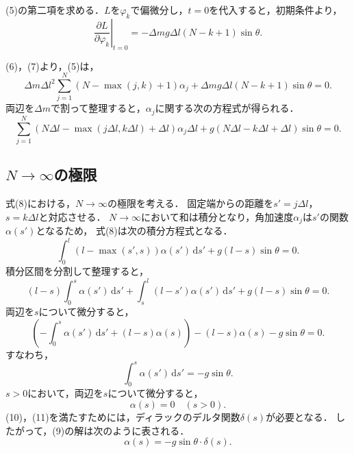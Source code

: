 \documentclass[]{jlreq}
\begin{document}
(5)の第二項を求める．$L$を$\varphi_k$で偏微分し，$t = 0$を代入すると，初期条件より，
\begin{equation}
  \left.\frac{\partial L}{\partial \varphi_k}\right|_{t = 0}
  = - \varDelta m g \varDelta l \left(N - k + 1\right) \sin \theta.
\end{equation}

(6)，(7)より，(5)は，
\begin{equation*}
  \varDelta m {\varDelta l}^2 \sum_{j = 1}^{N}
  \left(N - \max \left(j, k\right) + 1\right) \alpha_j
  + \varDelta m g \varDelta l \left(N - k + 1\right) \sin \theta = 0.
\end{equation*}
両辺を$\varDelta m$で割って整理すると，$\alpha_j$に関する次の方程式が得られる．
\begin{equation}
  \sum_{j = 1}^{N} \left(N \varDelta l
  - \max \left(j \varDelta l, k \varDelta l\right) + \varDelta l\right) \alpha_j
  \varDelta l + g \left(N \varDelta l - k \varDelta l + \varDelta l\right) \sin \theta = 0.
\end{equation}



\subsection{$N \rightarrow \infty$の極限}
式(8)における，$N \rightarrow \infty$の極限を考える．
固定端からの距離を$s' = j \varDelta l$，$s = k \varDelta l$と対応させる．
$N \rightarrow \infty$において和は積分となり，角加速度$\alpha_j$は$s'$の関数$\alpha\left(s'\right)$となるため，
式(8)は次の積分方程式となる．
\begin{equation}
  \int_{0}^{l} \left(l - \max \left(s', s\right)\right)
  \alpha\left(s'\right) \,\mathrm{d}s'
  + g \left(l - s\right) \sin \theta = 0. 
\end{equation}
積分区間を分割して整理すると，
\begin{equation*}
  \left(l - s\right) \int_{0}^{s} \alpha\left(s'\right) \,\mathrm{d}s'
  + \int_{s}^{l} \left(l - s'\right) \alpha\left(s'\right) \,\mathrm{d}s'
  + g \left(l - s\right) \sin \theta = 0.
\end{equation*}
両辺を$s$について微分すると，
\begin{equation*}
  \left( - \int_{0}^{s} \alpha\left(s'\right) \,\mathrm{d}s'
  + \left(l - s\right) \alpha\left(s\right) \right)
  - \left(l - s\right) \alpha\left(s\right)
  - g \sin \theta = 0.
\end{equation*}
すなわち，
\begin{equation}
  \int_{0}^{s} \alpha\left(s'\right) \,\mathrm{d}s' = -g \sin \theta.
\end{equation}
$s > 0$において，両辺を$s$について微分すると，
\begin{equation}
  \alpha\left(s\right) = 0 \quad \left(s > 0\right).
\end{equation}
(10)，(11)を満たすためには，ディラックのデルタ関数$\delta \left(s\right)$が必要となる．
したがって，(9)の解は次のように表される．
\begin{equation}
  \alpha\left(s\right) = -g \sin \theta \cdot \delta \left(s\right).
\end{equation}
\end{document}
